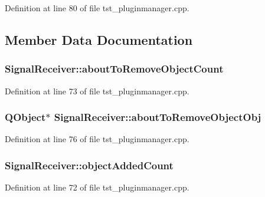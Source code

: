 Definition at line 80 of file tst\-\_\-pluginmanager.\-cpp.



\subsection{Member Data Documentation}
\hypertarget{class_signal_receiver_a81ab73157174745619fa9223f49ce09d}{
\subsubsection[{about\-To\-Remove\-Object\-Count}]{ Signal\-Receiver\-::about\-To\-Remove\-Object\-Count}}\label{class_signal_receiver_a81ab73157174745619fa9223f49ce09d}


Definition at line 73 of file tst\-\_\-pluginmanager.\-cpp.

\hypertarget{class_signal_receiver_a6eb3b4bcea370d253baf00da53fdab81}{
\subsubsection[{about\-To\-Remove\-Object\-Obj}]{\setlength{\rightskip}{0pt plus 5cm}Q\-Object$\ast$ Signal\-Receiver\-::about\-To\-Remove\-Object\-Obj}}\label{class_signal_receiver_a6eb3b4bcea370d253baf00da53fdab81}


Definition at line 76 of file tst\-\_\-pluginmanager.\-cpp.

\hypertarget{class_signal_receiver_a6930c4532fbbbd583414806ebfb5509e}{
\subsubsection[{object\-Added\-Count}]{ Signal\-Receiver\-::object\-Added\-Count}}\label{class_signal_receiver_a6930c4532fbbbd583414806ebfb5509e}


Definition at line 72 of file tst\-\_\-pluginmanager.\-cpp.

